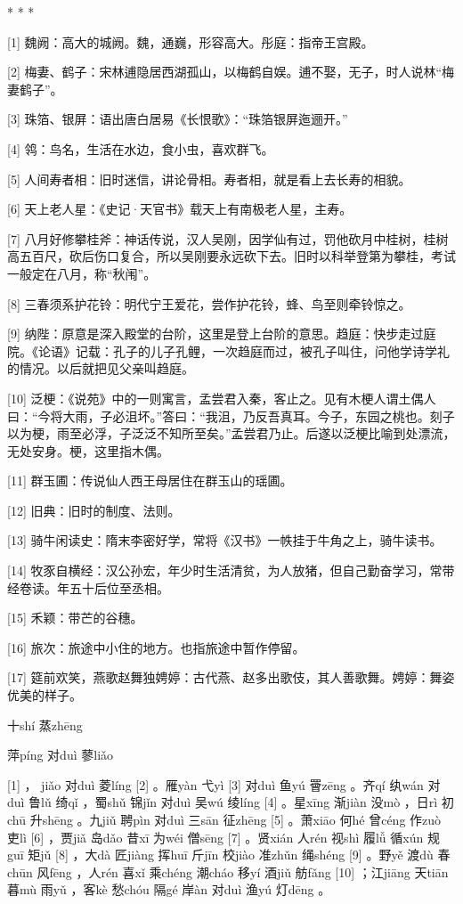 \documentclass[12pt,UTF8]{ctexbook}
\begin{document}
* * *



[1] 魏阙：高大的城阙。魏，通巍，形容高大。彤庭：指帝王宫殿。

[2] 梅妻、鹤子：宋林逋隐居西湖孤山，以梅鹤自娱。逋不娶，无子，时人说林“梅妻鹤子”。

[3] 珠箔、银屏：语出唐白居易《长恨歌》：“珠箔银屏迤逦开。”

[4] 鸰：鸟名，生活在水边，食小虫，喜欢群飞。

[5] 人间寿者相：旧时迷信，讲论骨相。寿者相，就是看上去长寿的相貌。

[6] 天上老人星：《史记·天官书》载天上有南极老人星，主寿。

[7] 八月好修攀桂斧：神话传说，汉人吴刚，因学仙有过，罚他砍月中桂树，桂树高五百尺，砍后伤口复合，所以吴刚要永远砍下去。旧时以科举登第为攀桂，考试一般定在八月，称“秋闱”。

[8] 三春须系护花铃：明代宁王爱花，尝作护花铃，蜂、鸟至则牵铃惊之。

[9] 纳陛：原意是深入殿堂的台阶，这里是登上台阶的意思。趋庭：快步走过庭院。《论语》记载：孔子的儿子孔鲤，一次趋庭而过，被孔子叫住，问他学诗学礼的情况。以后就把见父亲叫趋庭。

[10] 泛梗：《说苑》中的一则寓言，孟尝君入秦，客止之。见有木梗人谓土偶人曰：“今将大雨，子必沮坏。”答曰：“我沮，乃反吾真耳。今子，东园之桃也。刻子以为梗，雨至必浮，子泛泛不知所至矣。”孟尝君乃止。后遂以泛梗比喻到处漂流，无处安身。梗，这里指木偶。

[11] 群玉圃：传说仙人西王母居住在群玉山的瑶圃。

[12] 旧典：旧时的制度、法则。

[13] 骑牛闲读史：隋末李密好学，常将《汉书》一帙挂于牛角之上，骑牛读书。

[14] 牧豕自横经：汉公孙宏，年少时生活清贫，为人放猪，但自己勤奋学习，常带经卷读。年五十后位至丞相。

[15] 禾颖：带芒的谷穗。

[16] 旅次：旅途中小住的地方。也指旅途中暂作停留。

[17] 筵前欢笑，燕歌赵舞独娉婷：古代燕、赵多出歌伎，其人善歌舞。娉婷：舞姿优美的样子。





十shí 蒸zhēng


萍píng 对duì 蓼liǎo





[1] ， jiǎo 对duì 菱líng [2] 。雁yàn 弋yì [3] 对duì 鱼yú 罾zēng 。齐qí 纨wán 对duì 鲁lǔ 绮qǐ ，蜀shǔ 锦jǐn 对duì 吴wú 绫líng [4] 。星xīng 渐jiàn 没mò ，日rì 初chū 升shēng 。九jiǔ 聘pìn 对duì 三sān 征zhēng [5] 。萧xiāo 何hé 曾céng 作zuò 吏lì [6] ，贾jiǎ 岛dǎo 昔xī 为wéi 僧sēng [7] 。贤xián 人rén 视shì 履lǚ 循xún 规guī 矩jǔ [8] ，大dà 匠jiàng 挥huī 斤jīn 校jiào 准zhǔn 绳shéng [9] 。野yě 渡dù 春chūn 风fēng ，人rén 喜xǐ 乘chéng 潮cháo 移yí 酒jiǔ 舫fǎng [10] ；江jiāng 天tiān 暮mù 雨yǔ ，客kè 愁chóu 隔gé 岸àn 对duì 渔yú 灯dēng 。
\end{document}
